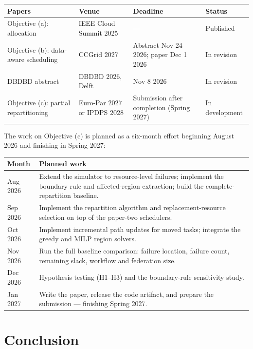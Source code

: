 \documentclass[11pt]{article}
\begin{document}
\begin{center}\small
\begin{tabular}{@{}p{4.4cm}p{2.8cm}p{3.6cm}p{2.6cm}@{}}
\toprule
Papers & Venue & Deadline & Status \\
\midrule
Objective (a): allocation & IEEE Cloud Summit 2025 & --- &
Published \\
Objective (b): data-aware scheduling & CCGrid 2027 &
Abstract Nov 24 2026; paper Dec 1 2026 & In revision \\
DBDBD abstract & DBDBD 2026, Delft & Nov 8 2026 &
In revision \\
Objective (c): partial repartitioning & Euro-Par 2027 or
IPDPS 2028 & Submission after completion (Spring 2027) &
In development \\
\bottomrule
\end{tabular}
\end{center}

The work on Objective (c) is planned as a six-month effort
beginning August 2026 and finishing in Spring 2027:

\begin{center}\small
\begin{tabular}{@{}p{2.4cm}p{10.6cm}@{}}
\toprule
Month & Planned work \\
\midrule
Aug 2026 & Extend the simulator to resource-level failures;
implement the boundary rule and affected-region extraction;
build the complete-repartition baseline. \\
Sep 2026 & Implement the repartition algorithm and
replacement-resource selection on top of the paper-two
schedulers. \\
Oct 2026 & Implement incremental path updates for moved
tasks; integrate the greedy and MILP region solvers. \\
Nov 2026 & Run the full baseline comparison: failure
location, failure count, remaining slack, workflow and
federation size. \\
Dec 2026 & Hypothesis testing (H1--H3) and the
boundary-rule sensitivity study. \\
Jan 2027 & Write the paper, release the code artifact, and
prepare the submission --- finishing Spring 2027. \\
\bottomrule
\end{tabular}
\end{center}

\section{Conclusion}
\label{sec:concl}
\end{document}
